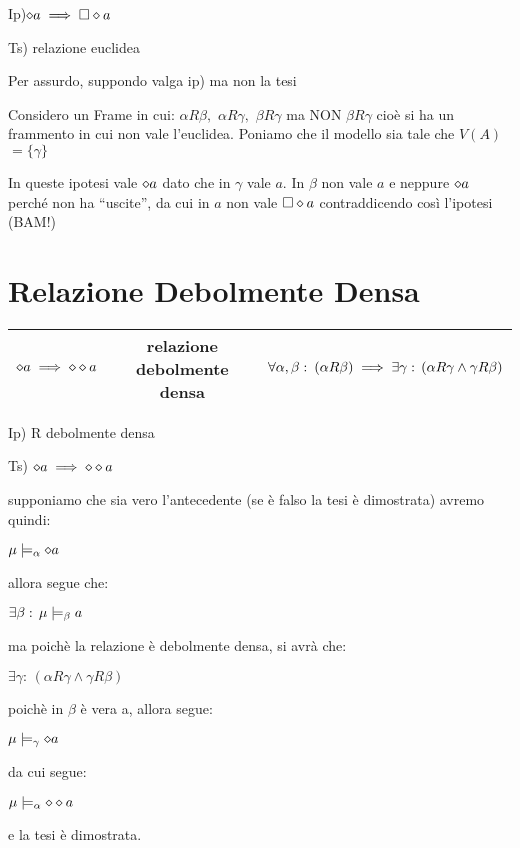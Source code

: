 Ip)$\diamond a\implies\square\diamond a$

Ts) relazione euclidea

Per assurdo, suppondo valga ip) ma non la tesi

Considero un Frame in cui: $\alpha R\beta,$ $\alpha R\gamma,$ $\beta R\gamma$
ma NON $\beta R\gamma$ cioè si ha un frammento in cui non vale l'euclidea.
Poniamo che il modello sia tale che $V(A)$$=\{\gamma\}$

In queste ipotesi vale $\diamond a$ dato che in $\gamma$ vale $a$. In
$\beta$ non vale $a$ e neppure $\diamond a$ perché non ha ``uscite'',
da cui in $a$ non vale $\square\diamond a$ contraddicendo così l'ipotesi
(BAM!) 


\section{Relazione Debolmente Densa}

\begin{tabular}{|c|c|c|}
\hline 
$\diamond a\implies\diamond\diamond a$  & relazione debolmente densa  & $\forall\alpha,\beta:\:(\alpha R\beta)\implies\exists\gamma:\,(\alpha R\gamma\wedge\gamma R\beta)$\tabularnewline
\hline 
\end{tabular}

Ip) R debolmente densa

Ts) $\diamond a\implies\diamond\diamond a$ 

supponiamo che sia vero l'antecedente (se è falso la tesi è dimostrata)
avremo quindi:

$\mu\models_{\alpha}\diamond a$

allora segue che:

$\exists\beta:\,\mu\models_{\beta}a$

ma poichè la relazione è debolmente densa, si avrà che:

$\exists\gamma:\,(\alpha R\gamma\wedge\gamma R\beta)$

poichè in $\beta$ è vera a, allora segue:

$\mu\models_{\gamma}\diamond a$

da cui segue:

$\mu\models_{\alpha}\diamond\diamond a$

e la tesi è dimostrata.

\begin{center} 
\end{center} 

